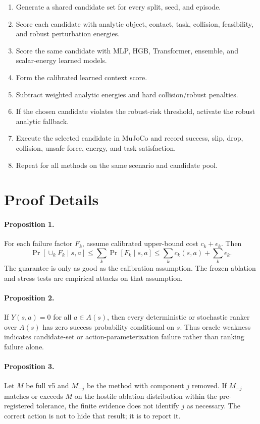 \documentclass{article}
\begin{document}
\begin{enumerate}
\item Generate a shared candidate set for every split, seed, and episode.
\item Score each candidate with analytic object, contact, task, collision, feasibility, and robust perturbation energies.
\item Score the same candidate with MLP, HGB, Transformer, ensemble, and scalar-energy learned models.
\item Form the calibrated learned context score.
\item Subtract weighted analytic energies and hard collision/robust penalties.
\item If the chosen candidate violates the robust-risk threshold, activate the robust analytic fallback.
\item Execute the selected candidate in MuJoCo and record success, slip, drop, collision, unsafe force, energy, and task satisfaction.
\item Repeat for all methods on the same scenario and candidate pool.
\end{enumerate}

\section{Proof Details}

\paragraph{Proposition 1.}
For each failure factor $F_k$, assume calibrated upper-bound cost $c_k+\epsilon_k$.
Then
\[
\Pr[\cup_k F_k\mid s,a]
\le \sum_k \Pr[F_k\mid s,a]
\le \sum_k c_k(s,a)+\sum_k\epsilon_k.
\]
The guarantee is only as good as the calibration assumption.
The frozen ablation and stress tests are empirical attacks on that assumption.

\paragraph{Proposition 2.}
If $Y(s,a)=0$ for all $a\in A(s)$, then every deterministic or stochastic ranker over $A(s)$ has zero success probability conditional on $s$.
Thus oracle weakness indicates candidate-set or action-parameterization failure rather than ranking failure alone.

\paragraph{Proposition 3.}
Let $M$ be full v5 and $M_{-j}$ be the method with component $j$ removed.
If $M_{-j}$ matches or exceeds $M$ on the hostile ablation distribution within the pre-registered tolerance, the finite evidence does not identify $j$ as necessary.
The correct action is not to hide that result; it is to report it.
\end{document}
